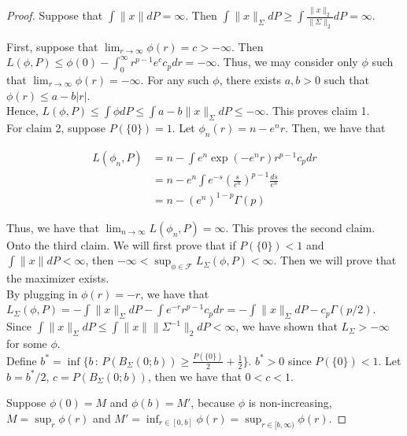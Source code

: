 \documentclass[12pt]{article}
\begin{document}
\begin{proof}

Suppose that $\int \|x \| dP = \infty$. Then $\int \| x \|_{\Sigma} dP \geq \int \frac{\| x \|_2 }{\| \Sigma \|_2} dP = \infty$. 

First, suppose that $\lim_{r \rightarrow \infty} \phi(r) = c > -\infty$. Then $L(\phi, P) \leq \phi(0) - \int_0^\infty r^{p-1} e^c c_p dr = -\infty$. Thus, we may consider only $\phi$ such that $\lim_{r \rightarrow \infty} \phi(r) = -\infty$. For any such $\phi$, there exists $a, b > 0$ such that $ \phi(r) \leq a - b |r|$. \\

Hence, $L( \phi, P) \leq \int \phi dP \leq \int a - b \| x \|_{\Sigma} dP \leq - \infty$. This proves claim 1.\\

For claim 2, suppose $P(\{0\}) = 1$. Let $\phi_n(r) = n - e^n r$. Then, we have that

\begin{align*}
L(\phi_n, P) &= n - \int e^n \exp(- e^n r) r^{p-1} c_p dr \\
  &= n - e^n \int e^{-s} \left( \frac{s}{e^n} \right)^{p-1} \frac{ds}{e^n} \\
  &= n - (e^n)^{1-p} \Gamma(p) 
\end{align*}

Thus, we have that $\lim_{n \rightarrow \infty} L(\phi_n, P) = \infty$. This proves the second claim.\\

Onto the third claim. We will first prove that if $P(\{0\}) < 1$ and $\int \| x \| dP < \infty$, then $-\infty <\sup_{\phi \in \mathcal{F}} L_{\Sigma}(\phi, P) < \infty$. Then we will prove that the maximizer exists. \\


By plugging in $\phi(r) = -r$, we have that $L_{\Sigma}(\phi, P) = -\int \| x \|_{\Sigma} dP - \int e^{-r} r^{p-1} c_p dr = - \int \| x \|_{\Sigma} dP - c_p \Gamma(p/2)$. Since $\int \| x \|_{\Sigma} dP \leq \int \| x\| \| \Sigma^{-1} \|_2 dP < \infty$, we have shown that $L_{\Sigma} > -\infty$ for some $\phi$. \\


Define $b^* = \inf \{ b \,:\, P( B_{\Sigma}(0; b)) \geq \frac{P(\{0\})}{2} + \frac{1}{2} \}$. $b^* > 0$ since $P(\{0\}) < 1$. Let $ b =b^*/2$, $c = P( B_{\Sigma}(0; b) )$, then we have that $0 < c < 1$. 


Suppose $\phi(0) = M$ and $\phi(b) = M'$, because $\phi$ is non-increasing, $M = \sup_r \phi(r)$ and $M' = \inf_{r \in [0,b]} \phi(r) = \sup_{r \in [b, \infty)} \phi(r)$. 


\end{proof}
\end{document}

